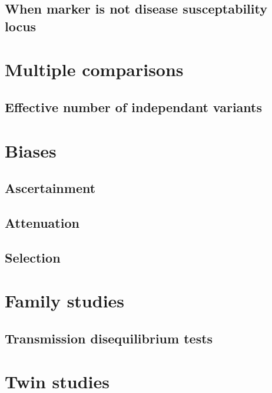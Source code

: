 \documentclass[]{book}
\theoremstyle{definition}
\theoremstyle{definition}
\theoremstyle{definition}
\theoremstyle{remark}
\begin{document}
\subsection{When marker is not disease susceptability
locus}\label{when-marker-is-not-disease-susceptability-locus}

\section{Multiple comparisons}\label{multiple-comparisons}

\subsection{Effective number of independant
variants}\label{effective-number-of-independant-variants}

\section{Biases}\label{biases}

\subsection{Ascertainment}\label{ascertainment}

\subsection{Attenuation}\label{attenuation}

\subsection{Selection}\label{selection}

\section{Family studies}\label{family-studies}

\subsection{Transmission disequilibrium
tests}\label{transmission-disequilibrium-tests}

\section{Twin studies}\label{twin-studies-1}
\end{document}

